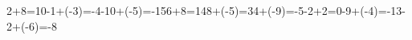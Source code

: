 \documentclass[12pt]{article}
\begin{document}
 
2+8=10-1+(-3)=-4-10+(-5)=-156+8=148+(-5)=34+(-9)=-5-2+2=0-9+(-4)=-13-2+(-6)=-8
\end{document}
